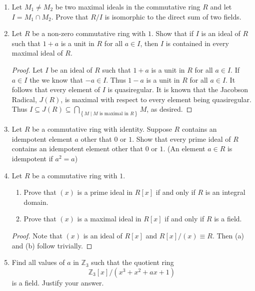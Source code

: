 \documentclass{article}
\theoremstyle{definition}
\newcommand{\Z}{\mathbb{Z}}
\newcommand{\set}[1]{\left\{#1\right\}}
\begin{document}
\begin{enumerate}
            \item Let $M_1 \neq M_2$ be two maximal ideals in the commutative ring $R$ and let $I=M_1\cap M_2$. Prove that $R/I$ is isomorphic to the direct sum of two fields. 
            

            \item Let $R$ be a non-zero commutative ring with $1$. Show that if $I$ is an ideal of $R$ such that $1+a$ is a unit in $R$ for all $a\in I$, then $I$ is contained in every maximal ideal of $R$.
            
            \begin{proof}
                Let $I$ be an ideal of $R$ such that $1+a$ is a unit in $R$ for all $a\in I$. If $a\in I$ the we know that $-a\in I$. Thus $1-a$ is a unit in $R$ for all $a\in I$. It follows that every element of $I$ is quasiregular. It is known that the Jacobson Radical, $J(R)$, is maximal with respect to every element being quasiregular. Thus $I\subseteq J(R) \subseteq \bigcap_{\set{M\mid M \text{ is maximal in } R}}M$, as desired.
            \end{proof}

            \item Let $R$ be a commutative ring with identity. Suppose $R$ contains an idempotent element $a$ other that $0$ or $1$. Show that every prime ideal of $R$ contains an idempotent element other that $0$ or $1$. (An element $a\in R$ is idempotent if $a^2=a$)
            
            \item Let $R$ be a commutative ring with $1$.
                
                \begin{enumerate}
                    \item Prove that $(x)$ is a prime ideal in $R[x]$ if and only if $R$ is an integral domain.
                    \item Prove that $(x)$ is a maximal ideal in $R[x]$ if and only if $R$ is a field.
                \end{enumerate}
            
            \begin{proof}
                Note that $(x)$ is an ideal of $R[x]$ and $R[x]/(x) \equiv R$. Then (a) and (b) follow trivially.
            \end{proof}

            \item Find all values of $a$ in $\Z_3$ such that the quotient ring \[\Z_3[x]/(x^3+x^2+ax+1)\] is a field. Justify your answer.
            

\end{enumerate}
\end{document}
